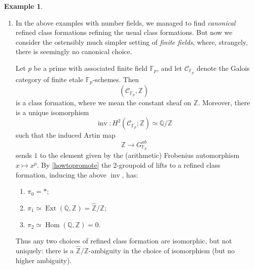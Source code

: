 \documentclass[12pt]{article}
\theoremstyle{definition}
\newtheorem{example}[theorem]{Example}
\newcommand{\on}{\operatorname}
\newcommand{\mc}{\mathcal}
\newcommand{\mbb}{\mathbb}
\newcommand{\wh}{\widehat}
\begin{document}
\begin{example}
\begin{enumerate}
More explicitly, the class groups in this class formation are as follows: for $L/K$ unramified outside $S$, we have
$$A_{L,S} = L^\times\backslash\mathbb{A}_L^\times/\prod_{\mu\not\in S}(L_\mu^\times)^1.$$
Suppose $S$ is finite and contains all archimedean places, so that $L/K$ corresponds to the finite etale $\mc{O}_{K,S}$-algebra $\mc{O}_{L,S}$.  By the usual adelic descent, we can reinterpret the above class group as being the ``compactly supported Picard group'' of $\mc{O}_{L,S}$, that is the abelian group of line bundles on $\on{Spec}(\mc{O}_{L,S})$ equipped with a trivialization on base-change to $\sqcup_{\mu\in S} \on{Spec}(L_\mu)$.  (Such objects have no automorphisms, so this $\on{Pic}_c(\mc{O}_{L,S})$ is legitimately an abelian group.)  This interpretation gives us an exact sequence
$$0 \to \mc{O}_{L,S}^\times \to \prod_{\mu\in S} L_\mu^\times \to A_{L,S} \to \on{Pic}(\mc{O}_{L,S}) \to 0$$
which is often convenient for analyzing $A_{L,S}$.


\item In the above examples with number fields, we managed to find \emph{canonical} refined class formations refining the usual class formations.  But now we consider the ostensibly much simpler setting of \emph{finite fields}, where, strangely, there is seemingly no canonical choice.

Let $p$ be a prime with associated finite field $\mbb{F}_p$, and let $\mc{C}_{\mbb{F}_p}$ denote the Galois category of finite etale $\mbb{F}_p$-schemes.  Then
$$(\mc{C}_{\mbb{F}_p},\mbb{Z})$$
is a class formation, where we mean the constant sheaf on $\mbb{Z}$.  Moreover, there is a unique isomorphism
$$\on{inv}:H^2(\mc{C}_{\mbb{F}_p};\mbb{Z})\simeq \mbb{Q}/\mbb{Z}$$
such that the induced Artin map
$$\mbb{Z}\to G_{\mbb{F}_p}^{ab}$$
sends $1$ to the element given by the (arithmetic) Frobenius automorphism $x\mapsto x^p$.  By \ref{howtopromote} the 2-groupoid of lifts to a refined class formation, inducing the above $\on{inv}$, has:
\begin{enumerate}
\item $\pi_0=\ast$;
\item $\pi_1\simeq\on{Ext}(\mbb{Q},\mbb{Z})=\wh{\mbb{Z}}/\mbb{Z}$;
\item $\pi_2\simeq\on{Hom}(\mbb{Q},\mbb{Z})=0.$
\end{enumerate}
Thus  any two choices of refined class formation are isomorphic, but not uniquely: there is a $\wh{\mbb{Z}}/\mbb{Z}$-ambiguity in the choice of isomorphism (but no higher ambiguity).


\end{enumerate}
\end{example}
\end{document}
